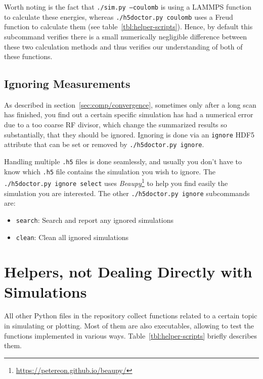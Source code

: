 Worth noting is the fact that \texttt{./sim.py --coulomb} is using a LAMMPS\cite{LAMMPS} function to calculate these energies, whereas \texttt{./h5doctor.py coulomb} uses a Freud\cite{freud} function to calculate them (see table~\ref{tbl:helper-scripts}). Hence, by default this subcommand verifies there is a small numerically negligible difference between these two calculation methods and thus verifies our understanding of both of these functions.

\subsection{Ignoring Measurements}

As described in section~\ref{sec:comp/convergence}, sometimes only after a long scan has finished, you find out a certain specific simulation has had a numerical error due to a too coarse RF divisor, which change the summarized results so substantially, that they should be ignored. Ignoring is done via an \texttt{ignore} HDF5 attribute that can be set or removed by \texttt{./h5doctor.py ignore}.

Handling multiple \texttt{.h5} files is done seamlessly, and usually you don't have to know which \texttt{.h5} file contains the simulation you wish to ignore. The \texttt{./h5doctor.py ignore select} uses \textit{Beaupy}\footnote{\url{https://petereon.github.io/beaupy/}} to help you find easily the simulation you are interested. The other \texttt{./h5doctor.py ignore} subcommands are:

\begin{itemize}
	\item \texttt{search}: Search and report any ignored simulations
	\item \texttt{clean}: Clean all ignored simulations
\end{itemize}

\section{Helpers, not Dealing Directly with Simulations}

All other Python files in the repository collect functions related to a certain topic in simulating or plotting. Most of them are also executables, allowing to test the functions implemented in various ways. Table~\ref{tbl:helper-scripts} briefly describes them.

